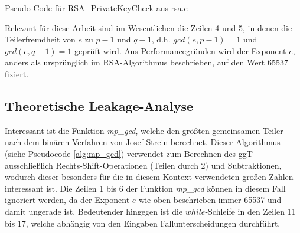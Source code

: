 \begin{algorithm}[h]
\DontPrintSemicolon
\caption{Pseudo-Code für RSA_PrivateKeyCheck aus rsa.c}
\label{alg:RSA_PrivateKeyCheck}

\end{algorithm}


%

Relevant für diese Arbeit sind im Wesentlichen die Zeilen 4 und 5, in denen die Teilerfremdheit von $e$ zu $p-1$ und $q-1$, d.h. $gcd(e,p-1) = 1$ und $gcd(e,q-1) = 1$ geprüft wird.
Aus Performancegründen wird der Exponent $e$, anders als ursprünglich im RSA-Algorithmus beschrieben, auf den Wert 65537 fixiert.

\subsection{Theoretische Leakage-Analyse}

Interessant ist die Funktion \textit{mp_gcd}, welche den größten gemeinsamen Teiler nach dem binären Verfahren von Josef Strein \cite{SteinBinaryGCD} berechnet. 
Dieser Algorithmus (siehe Pseudocode \ref{alg:mp_gcd}) verwendet zum Berechnen des ggT ausschließlich Rechts-Shift-Operationen (Teilen durch 2) und Subtraktionen, wodurch dieser besonders für die in diesem Kontext verwendeten großen Zahlen interessant ist.
Die Zeilen 1 bis 6 der Funktion \textit{mp_gcd} können in diesem Fall ignoriert werden, da der Exponent $e$ wie oben beschrieben immer 65537 und damit ungerade ist. 
Bedeutender hingegen ist die $while$-Schleife in den Zeilen 11 bis 17, welche abhängig von den Eingaben Fallunterscheidungen durchführt. 

